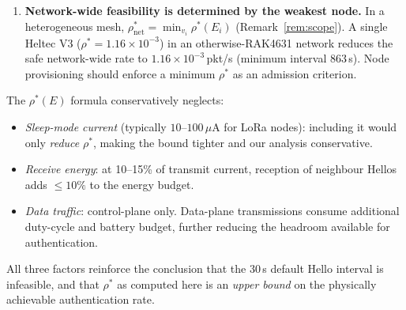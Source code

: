 \begin{enumerate}[label=\textbf{DG\arabic*.}]
  \item \textbf{Network-wide feasibility is determined by the weakest node.}\;
        In a heterogeneous mesh, $\rho^*_{\mathrm{net}} = \min_{v_i} \rho^*(E_i)$
        (Remark~\ref{rem:scope}).  A single Heltec V3 ($\rho^* = 1.16 \times 10^{-3}$)
        in an otherwise-RAK4631 network reduces the safe network-wide rate to
        $1.16 \times 10^{-3}$\,pkt/s (minimum interval 863\,s).  Node
        provisioning should enforce a minimum $\rho^*$ as an admission
        criterion.

\end{enumerate}

\begin{remark}
\label{rem:conservative}
The $\rho^*(E)$ formula conservatively neglects:
\begin{itemize}
  \item \emph{Sleep-mode current} (typically $10\text{--}100\,\mu\mathrm{A}$
        for LoRa nodes): including it would only \emph{reduce} $\rho^*$,
        making the bound tighter and our analysis conservative.
  \item \emph{Receive energy}: at 10--15\% of transmit current, reception of
        neighbour Hellos adds $\le 10\%$ to the energy budget.
  \item \emph{Data traffic}: control-plane only.  Data-plane transmissions
        consume additional duty-cycle and battery budget, further reducing the
        headroom available for authentication.
\end{itemize}
All three factors reinforce the conclusion that the 30\,s default Hello
interval is infeasible, and that $\rho^*$ as computed here is an
\emph{upper bound} on the physically achievable authentication rate.
\end{remark}
